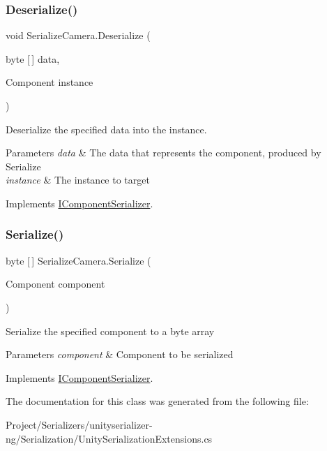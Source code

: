 \subsubsection{\texorpdfstring{Deserialize()}{Deserialize()}}
{\footnotesize\ttfamily void Serialize\+Camera.\+Deserialize (\begin{DoxyParamCaption}\item[{byte \mbox{[}$\,$\mbox{]}}]{data,  }\item[{Component}]{instance }\end{DoxyParamCaption})\hspace{0.3cm}{\ttfamily [inline]}}



Deserialize the specified data into the instance. 


\begin{DoxyParams}{Parameters}
{\em data} & The data that represents the component, produced by Serialize \\
\hline
{\em instance} & The instance to target \\
\hline
\end{DoxyParams}


Implements \hyperlink{interface_i_component_serializer_a4cc366a5c78b33d47a90c209d8fed883}{I\+Component\+Serializer}.

\mbox{\label{class_serialize_camera_a003d716552672a6f3994a768aded2235}} 
\subsubsection{\texorpdfstring{Serialize()}{Serialize()}}
{\footnotesize\ttfamily byte \mbox{[}$\,$\mbox{]} Serialize\+Camera.\+Serialize (\begin{DoxyParamCaption}\item[{Component}]{component }\end{DoxyParamCaption})\hspace{0.3cm}{\ttfamily [inline]}}



Serialize the specified component to a byte array 


\begin{DoxyParams}{Parameters}
{\em component} & Component to be serialized \\
\hline
\end{DoxyParams}


Implements \hyperlink{interface_i_component_serializer_ab2aa38005665496b62d6c54b5f0dbd31}{I\+Component\+Serializer}.



The documentation for this class was generated from the following file\+:\begin{DoxyCompactItemize}
\item 
Project/\+Serializers/unityserializer-\/ng/\+Serialization/Unity\+Serialization\+Extensions.\+cs\end{DoxyCompactItemize}
